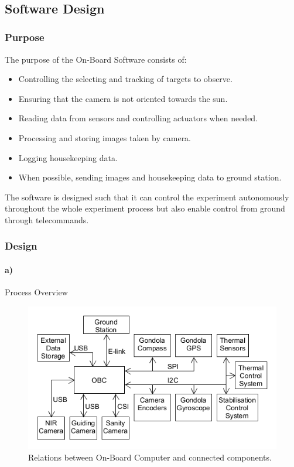 $  $\pagebreak
\subsection{Software Design}

\subsubsection{Purpose}

The purpose of the On-Board Software consists of:
\begin{itemize}
	\item Controlling the selecting and tracking of targets to observe.
	\item Ensuring that the camera is not oriented towards the sun.
	\item Reading data from sensors and controlling actuators when needed.
	\item Processing and storing images taken by camera.
	\item Logging housekeeping data.
	\item When possible, sending images and housekeeping data to ground station.
\end{itemize}

The software is designed such that it can control the experiment autonomously throughout the whole experiment process but also enable control from ground through telecommands.

\subsubsection{Design}

\paragraph{a)} Process Overview

\begin{figure}[H]
	\centering
	\includegraphics[width=\textwidth]{4-experiment-design/img/software/process-overview.png}
	\caption{Relations between On-Board Computer and connected components.}
	\label{fig:software-process-overview}
\end{figure}

